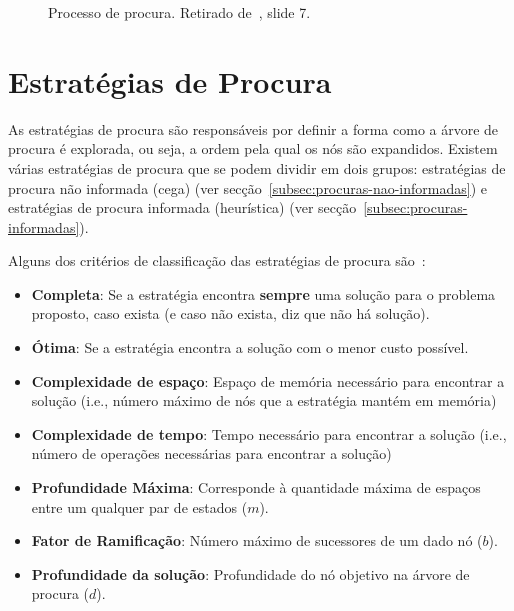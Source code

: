 \begin{figure}[H]
    \label{fig:processo-procura}
    \begin{center}
    \end{center}
    \caption{Processo de procura.
    Retirado de~\cite{isel:iasa:slides:proc-espaco-estados-parte-1}, slide 7.}
\end{figure}


\section{Estratégias de Procura}\label{sec:estrategias-procura}
As estratégias de procura são responsáveis por definir a forma como a árvore de procura é explorada, ou seja, a ordem pela qual os nós são expandidos.
Existem várias estratégias de procura que se podem dividir em dois grupos: estratégias de procura não informada (cega) (ver secção~\ref{subsec:procuras-nao-informadas}) e estratégias de procura informada (heurística) (ver secção~\ref{subsec:procuras-informadas}).

Alguns dos critérios de classificação das estratégias de procura são~\cite{ist:leic:resumos:procura-cega, isel:iasa:slides:proc-espaco-estados-parte-2}:

\begin{itemize}
    \item \textbf{Completa}: Se a estratégia encontra \textbf{sempre} uma solução para o problema proposto, caso exista (e caso não exista, diz que não há solução).
    \item \textbf{Ótima}: Se a estratégia encontra a solução com o menor custo possível.
    \item \textbf{Complexidade de espaço}: Espaço de memória necessário para encontrar a solução (i.e., número máximo de nós que a estratégia mantém em memória)
    \item \textbf{Complexidade de tempo}: Tempo necessário para encontrar a solução (i.e., número de operações necessárias para encontrar a solução)
    \item \textbf{Profundidade Máxima}: Corresponde à quantidade máxima de espaços entre um qualquer par de estados ($m$).
    \item \textbf{Fator de Ramificação}: Número máximo de sucessores de um dado nó ($b$).
    \item \textbf{Profundidade da solução}: Profundidade do nó objetivo na árvore de procura ($d$).
\end{itemize}

